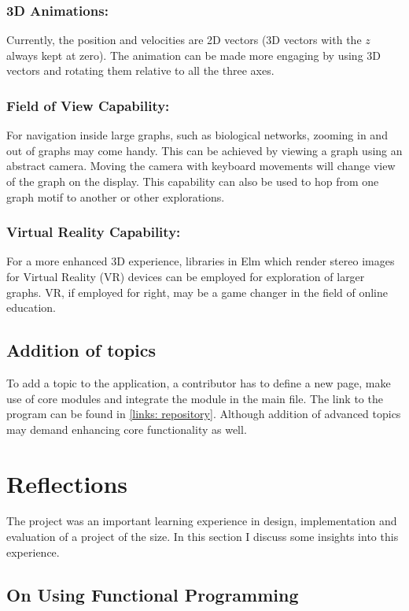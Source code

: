 \subsubsection{3D Animations:} Currently, the position and velocities are 2D
vectors (3D vectors with the $z$ always kept at zero). The animation can be
made more engaging by using 3D vectors and rotating them relative to all the
three axes.

\subsubsection{Field of View Capability:} 
For navigation inside large graphs, such as biological networks, zooming in
and out of graphs may come handy. This can be achieved by viewing a graph using
an abstract camera. Moving the camera with keyboard movements will change view
of the graph on the display. This capability can also be used to hop from one
graph motif to another or other explorations.

\subsubsection{Virtual Reality Capability:}
For a more enhanced 3D experience, libraries in Elm which render stereo images
for Virtual Reality (VR) devices can be employed for exploration of larger
graphs. VR, if employed for right, may be a game changer in the field of
online education.

\subsection{Addition of topics}
To add a topic to the application, a contributor has to define a new page, make use of core modules and integrate the module in the main
file. The link to the program can be found in \autoref{links: repository}.
Although addition of advanced topics may demand enhancing core functionality as
well.

\section{Reflections}

The project was an important learning experience in design, implementation and
evaluation of a project of the size. In this section I discuss some insights into this experience.

\subsection{On Using Functional Programming} 
\label{reflection: functional}

